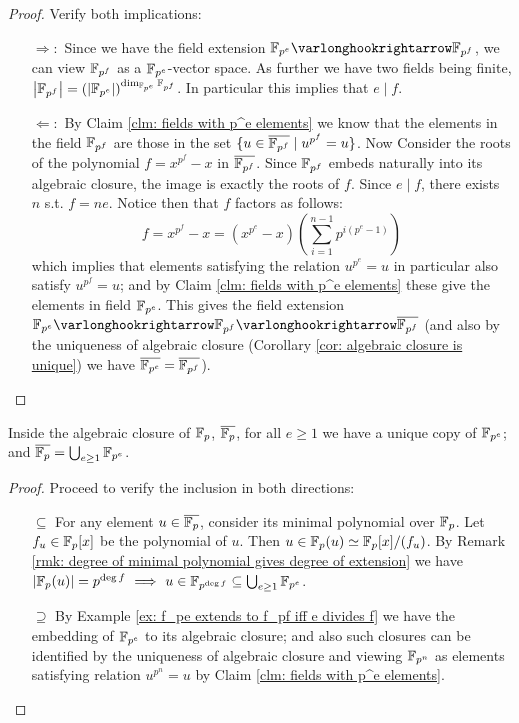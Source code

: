 \documentclass{article}
\begin{document}
\begin{proof}
    Verify both implications:
    \begin{itemize}
        \item[$\Rightarrow:$] Since we have the field extension $\F_{p^e} \ext \F_{p^f}$, we can view $\mathbb{F}_{p^f}$ as a $\mathbb{F}_{p^e}$-vector space. As further we have two fields being finite, $\left|\mathbb{F}_{p^f}\right| = \left( \left|\mathbb{F}_{p^e}\right| \right)^{\dim_{\mathbb{F}_{p^e}} \mathbb{F}_{p^f}}$. In particular this implies that $e \mid f$.
        \item[$\Leftarrow:$] By Claim \ref{clm: fields with p^e elements} we know that the elements in the field $\mathbb{F}_{p^f}$ are those in the set $\{ u \in \overline{\mathbb{F}_{p^f}} \mid u^{p^f} = u \}$. Now Consider the roots of the polynomial $f = x^{p^f} - x$ in $\overline{\mathbb{F}_{p^f}}$. Since $\mathbb{F}_{p^f}$ embeds naturally into its algebraic closure, the image is exactly the roots of $f$. Since $e \mid f$, there exists $n$ s.t. $f = ne$. Notice then that $f$ factors as follows:
        \[
            f = x^{p^f} - x = \left( x^{p^e} - x \right) \left( \sum_{i = 1}^{n-1} p^{i(p^e - 1)} \right)
        \]
        which implies that elements satisfying the relation $u^{p^e} = u$ in particular also satisfy $u^{p^f} = u$; and by Claim \ref{clm: fields with p^e elements} these give the elements in field $\mathbb{F}_{p^e}$. This gives the field extension $\F_{p^e} \ext \F_{p^f} \ext \overline{\F_{p^f}}$ (and also by the uniqueness of algebraic closure (Corollary \ref{cor: algebraic closure is unique}) we have $\overline{\mathbb{F}_{p^e}} = \overline{\mathbb{F}_{p^f}}$).
    \end{itemize}
\end{proof}
    
\begin{example}
    Inside the algebraic closure of $\mathbb{F}_p$, $\overline{\mathbb{F}_p}$, for all $e \geq 1$ we have a unique copy of $\mathbb{F}_{p^e}$; and $\overline{\mathbb{F}_p} = \bigcup_{e \geq 1} \mathbb{F}_{p^e}$.
\end{example}

\begin{proof}
    Proceed to verify the inclusion in both directions:
    \begin{enumerate}
        \item[$\subseteq$] For any element $u \in \overline{\mathbb{F}_p}$, consider its minimal polynomial over $\mathbb{F}_p$. Let $f_u \in \mathbb{F}_p[x]$ be the polynomial of $u$. Then $u \in \mathbb{F}_p(u) \simeq \mathbb{F}_p[x]/(f_u)$. By Remark \ref{rmk: degree of minimal polynomial gives degree of extension} we have $\left|\mathbb{F}_p(u)\right| = p^{\deg f} \ \Longrightarrow\  u \in \mathbb{F}_{p^{\deg f}} \subseteq \bigcup_{e \geq 1} \mathbb{F}_{p^e}$. 
        \item[$\supseteq$] By Example \ref{ex: f_pe extends to f_pf iff e divides f} we have the embedding of $\mathbb{F}_{p^e}$ to its algebraic closure; and also such closures can be identified by the uniqueness of algebraic closure and viewing $\mathbb{F}_{p^n}$ as elements satisfying relation $u^{p^n} = u$ by Claim \ref{clm: fields with p^e elements}.
    \end{enumerate}
\end{proof}
\end{document}
